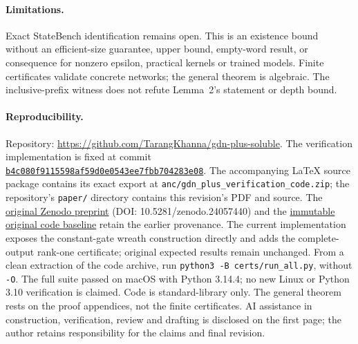 \documentclass[10pt]{article}
\theoremstyle{remark}
\begin{document}
\paragraph{Limitations.}
Exact StateBench identification remains open. This is an existence bound without
an efficient-size guarantee, upper bound, empty-word result, or consequence for
nonzero epsilon, practical kernels or trained models. Finite certificates
validate concrete networks; the general theorem is algebraic. The inclusive-prefix
witness does not refute Lemma~2's statement or depth bound.

\paragraph{Reproducibility.}
Repository: \url{https://github.com/TarangKhanna/gdn-plus-soluble}.
The verification implementation is fixed at commit
\href{https://github.com/TarangKhanna/gdn-plus-soluble/tree/b4c080f9115598af59d0e0543ee7fbb704283e08}{\nolinkurl{b4c080f9115598af59d0e0543ee7fbb704283e08}}.
The accompanying LaTeX source package contains its exact export at
\texttt{anc/gdn\_plus\_verification\_code.zip}; the repository's \texttt{paper/}
directory contains this revision's PDF and source. The
\href{https://doi.org/10.5281/zenodo.24057440}{original Zenodo preprint}
(DOI: 10.5281/zenodo.24057440) and the
\href{https://github.com/TarangKhanna/gdn-plus-soluble/tree/871536d6037326b5ddf222763a4c58d6e7e3f646}{immutable original code baseline}
retain the earlier provenance. The current implementation exposes the
constant-gate wreath construction directly and adds the complete-output
rank-one certificate; original expected results remain unchanged.
From a clean extraction of the code archive, run
\texttt{python3 -B certs/run\_all.py}, without \texttt{-O}.
The full suite passed on macOS with Python 3.14.4; no new Linux or Python 3.10
verification is claimed. Code is standard-library only. The general theorem
rests on the proof appendices, not the finite certificates. AI assistance in
construction, verification, review and drafting is disclosed on the first page;
the author retains responsibility for the claims and final revision.
\end{document}
